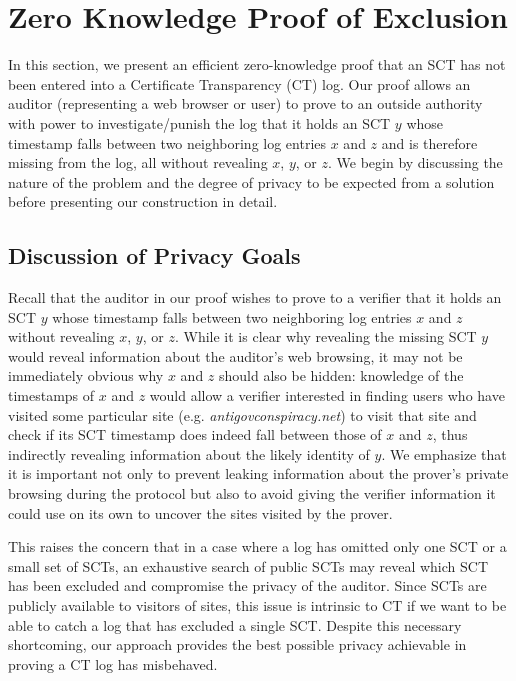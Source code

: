 \documentclass[letterpaper,twocolumn,10pt]{article}
\begin{document}
\section{Zero Knowledge Proof of Exclusion}
In this section, we present an efficient zero-knowledge proof that an SCT has not been entered into a Certificate Transparency (CT) log. Our proof allows an auditor (representing a web browser or user) to prove to an outside authority with power to investigate/punish the log that it holds an SCT $y$ whose timestamp falls between two neighboring log entries $x$ and $z$ and is therefore missing from the log, all without revealing $x$, $y$, or $z$. We begin by discussing the nature of the problem and the degree of privacy to be expected from a solution before presenting our construction in detail. 

\subsection{Discussion of Privacy Goals}
Recall that the auditor in our proof wishes to prove to a verifier that it holds an SCT $y$ whose timestamp falls between two neighboring log entries $x$ and $z$ without revealing $x$, $y$, or $z$. While it is clear why revealing the missing SCT $y$ would reveal information about the auditor's web browsing, it may not be immediately obvious why $x$ and $z$ should also be hidden: knowledge of the timestamps of $x$ and $z$ would allow a verifier interested in finding users who have visited some particular site (e.g. \emph{antigovconspiracy.net}) to visit that site and check if its SCT timestamp does indeed fall between those of $x$ and $z$, thus indirectly revealing information about the likely identity of $y$. We emphasize that it is important not only to prevent leaking information about the prover's private browsing during the protocol but also to avoid giving the verifier information it could use on its own to uncover the sites visited by the prover.

This raises the concern that in a case where a log has omitted only one SCT or a small set of SCTs, an exhaustive search of public SCTs may reveal which SCT has been excluded and compromise the privacy of the auditor. Since SCTs are publicly available to visitors of sites, this issue is intrinsic to CT if we want to be able to catch a log that has excluded a single SCT. Despite this necessary shortcoming, our approach provides the best possible privacy achievable in proving a CT log has misbehaved.
\end{document}
